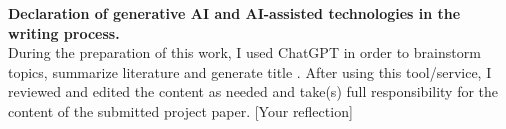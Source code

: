 \documentclass[12pt,twoside]{article}
\begin{document}
\vspace{-\baselineskip}

\textbf{Declaration of generative AI and AI-assisted technologies in the writing process.}\\
During the preparation of this work, I used ChatGPT in order to brainstorm topics, summarize literature and generate title .
After using this tool/service, I reviewed and edited the content as needed and take(s) full responsibility for the content of the submitted project paper.
[Your reflection]

\vspace{\baselineskip}

\printbibliography[heading=normalrefs,title={References}]
\end{document}
